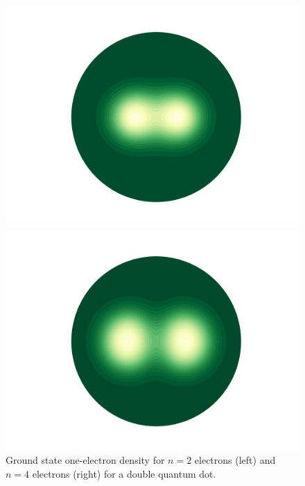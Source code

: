 \begin{figure}
    \centering
    \begin{minipage}{0.49\textwidth}
        \includegraphics[trim=4em 3.5em 4em 4em, clip=true, width=\textwidth]{results/figures/DW/rho_dw.png} 
    \end{minipage}\hfill
    \begin{minipage}{0.49\textwidth}
        \includegraphics[trim=4em 3.5em 4em 4em, clip=true, width=\textwidth]{results/figures/DW/rho_dw_n4.png} 
    \end{minipage}
    \caption{Ground state one-electron density for $n=2$ electrons (left)
        and $n=4$ electrons (right) for a double quantum dot.
    }
    \label{fig:2d_dw_rho}
\end{figure}


